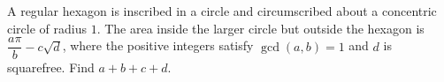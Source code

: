 A regular hexagon is inscribed in a circle and circumscribed about a concentric circle of radius $1$. The area inside the larger circle but outside the hexagon is $\dfrac{a\pi}{b}-c\sqrt d$, where the positive integers satisfy $\gcd(a,b)=1$ and $d$ is squarefree. Find $a+b+c+d$.
